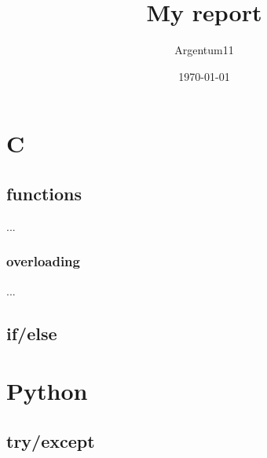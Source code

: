 \documentclass[11pt]{article}
\title{My report}
\author{Argentum11}
\date{\today}
\begin{document}
\maketitle
\tableofcontents

\section{C}
	\subsection{functions}
	...
		\subsubsection{overloading}
		...
	\subsection{if/else}
\section{Python}
	\subsection*{try/except}
\end{document}
